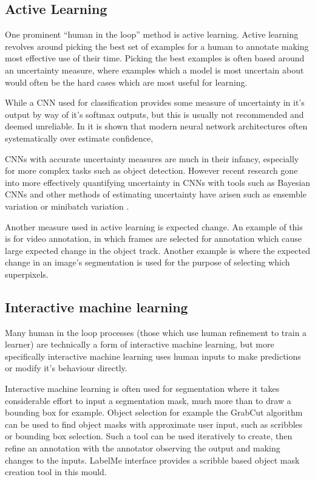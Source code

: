 \subsection{Active Learning}

One prominent ``human in the loop'' method is active learning. Active learning revolves around picking the best set of examples for a human to annotate making most effective use of their time. Picking the best examples is often based around an uncertainty measure, where examples which a model is most uncertain about would often be the hard cases which are most useful for learning. 
 
While a \gls{CNN} used for classification provides some measure of uncertainty in it's output by way of it's softmax outputs, but this is usually not recommended and deemed unreliable. In \cite{Guo2017} it is shown that modern neural network architectures often systematically over estimate confidence, 

\gls{CNN}s with accurate uncertainty measures are much in their infancy, especially for more complex tasks such as object detection. However recent research gone into more effectively quantifying uncertainty in \gls{CNN}s with tools such as Bayesian \gls{CNN}s \cite{Gal2017} and other methods of estimating uncertainty have arisen such as ensemble variation \cite{Beluch2018} or minibatch variation \cite{Chang2017}. 

Another measure used in active learning is expected change. An example of this is \cite{Vondrick2011} for video annotation, in which frames are selected for annotation which cause large expected change in the object track. Another example is \cite{Xu2017} where the expected change in an image's segmentation is used for the purpose of selecting which superpixels. 


\subsection{Interactive machine learning}

Many human in the loop processes (those which use human refinement to train a learner) are technically a form of interactive machine learning, but more specifically interactive machine learning uses human inputs to make predictions or modify it's behaviour directly.

Interactive machine learning is often used for segmentation where it takes considerable effort to input a segmentation mask, much more than to draw a bounding box for example. Object selection for example the GrabCut algorithm \cite{Rother} can be used to find object masks with approximate user input, such as scribbles or bounding box selection. Such a tool can be used iteratively to create, then refine an annotation with the annotator observing the output and making changes to the inputs.  LabelMe \cite{Russell2007} interface provides a scribble based object mask creation tool in this mould. 

